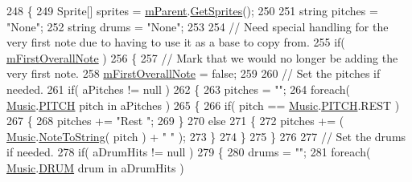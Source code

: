 \begin{DoxyCode}
248         \{
249             Sprite[] sprites = \hyperlink{class_song_creation_1_1_measure_display_panel_a997c583ac0b9687ff9399c9ed27d0dcb}{mParent}.\hyperlink{class_song_creation_1_1_note_display_container_a7165497797fbeea51e1571c69c5f510c}{GetSprites}();
250 
251             \textcolor{keywordtype}{string} pitches = \textcolor{stringliteral}{"None"};
252             \textcolor{keywordtype}{string} drums = \textcolor{stringliteral}{"None"};
253 
254             \textcolor{comment}{// Need special handling for the very first note due to having to use it as a base to copy
       from.}
255             \textcolor{keywordflow}{if}( \hyperlink{class_song_creation_1_1_measure_display_panel_a3794bf2a605eaa0595e6c6e41f5b458c}{mFirstOverallNote} )
256             \{
257                 \textcolor{comment}{// Mark that we would no longer be adding the very first note.}
258                 \hyperlink{class_song_creation_1_1_measure_display_panel_a3794bf2a605eaa0595e6c6e41f5b458c}{mFirstOverallNote} = \textcolor{keyword}{false};
259 
260                 \textcolor{comment}{// Set the pitches if needed.}
261                 \textcolor{keywordflow}{if}( aPitches != null )
262                 \{
263                     pitches = \textcolor{stringliteral}{""};
264                     \textcolor{keywordflow}{foreach}( \hyperlink{class_music}{Music}.\hyperlink{group___music_enums_ga508f69b199ea518f935486c990edac1d}{PITCH} pitch in aPitches )
265                     \{
266                         \textcolor{keywordflow}{if}( pitch == \hyperlink{class_music}{Music}.\hyperlink{group___music_enums_ga508f69b199ea518f935486c990edac1d}{PITCH}.REST )
267                         \{
268                             pitches += \textcolor{stringliteral}{"Rest "};
269                         \}
270                         \textcolor{keywordflow}{else}
271                         \{
272                             pitches += ( \hyperlink{class_music}{Music}.\hyperlink{group___music_stat_func_ga85a22c905d56d4c5f4e62159bfecee8c}{NoteToString}( pitch ) + \textcolor{stringliteral}{" "} );
273                         \}
274                     \}
275                 \}
276 
277                 \textcolor{comment}{// Set the drums if needed.}
278                 \textcolor{keywordflow}{if}( aDrumHits != null )
279                 \{
280                     drums = \textcolor{stringliteral}{""};
281                     \textcolor{keywordflow}{foreach}( \hyperlink{class_music}{Music}.\hyperlink{group___music_enums_gade475b4382c7066d1af13e7c13c029b6}{DRUM} drum in aDrumHits )

\end{DoxyCode}
